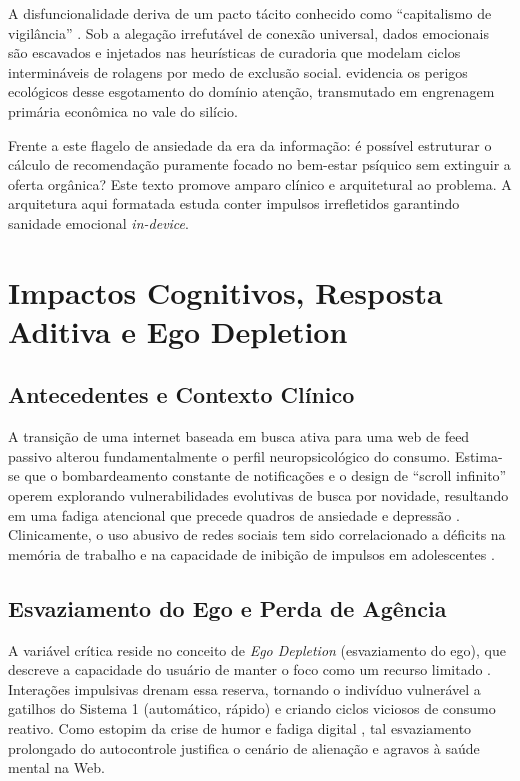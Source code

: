\documentclass[12pt, a4paper]{article}
\begin{document}
A disfuncionalidade deriva de um pacto tácito conhecido como ``capitalismo de vigilância'' \citep{zuboff2019}. Sob a alegação irrefutável de conexão universal, dados emocionais são escavados e injetados nas heurísticas de curadoria que modelam ciclos intermináveis de rolagens por medo de exclusão social. \citet{citton2017} evidencia os perigos ecológicos desse esgotamento do domínio atenção, transmutado em engrenagem primária econômica no vale do silício.

Frente a este flagelo de ansiedade da era da informação: é possível estruturar o cálculo de recomendação puramente focado no bem-estar psíquico sem extinguir a oferta orgânica? Este texto promove amparo clínico e arquitetural ao problema. A arquitetura aqui formatada estuda conter impulsos irrefletidos garantindo sanidade emocional \textit{in-device}.

\section{Impactos Cognitivos, Resposta Aditiva e Ego Depletion}

\subsection{Antecedentes e Contexto Clínico}

A transição de uma internet baseada em busca ativa para uma web de feed passivo alterou fundamentalmente o perfil neuropsicológico do consumo. Estima-se que o bombardeamento constante de notificações e o design de ``scroll infinito'' operem explorando vulnerabilidades evolutivas de busca por novidade, resultando em uma fadiga atencional que precede quadros de ansiedade e depressão \citep{hari2022}. Clinicamente, o uso abusivo de redes sociais tem sido correlacionado a déficits na memória de trabalho e na capacidade de inibição de impulsos em adolescentes \citep{costello2023}.

\subsection{Esvaziamento do Ego e Perda de Agência}

A variável crítica reside no conceito de \textit{Ego Depletion} (esvaziamento do ego), que descreve a capacidade do usuário de manter o foco como um recurso limitado \citep{kahneman2011}. Interações impulsivas drenam essa reserva, tornando o indivíduo vulnerável a gatilhos do Sistema 1 (automático, rápido) e criando ciclos viciosos de consumo reativo. Como estopim da crise de humor e fadiga digital \citep{paas2023}, tal esvaziamento prolongado do autocontrole justifica o cenário de alienação e agravos à saúde mental na Web.
\end{document}
